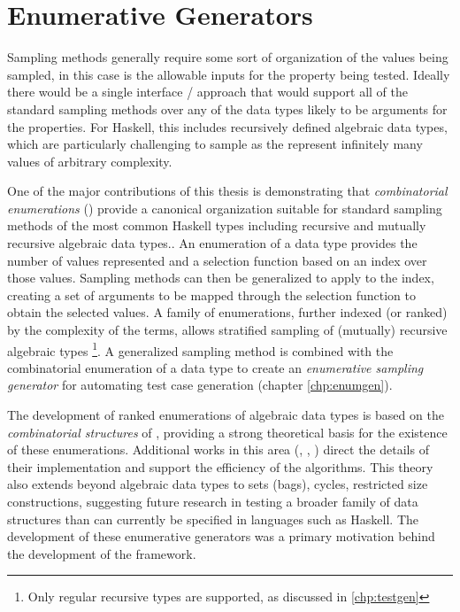 \section{Enumerative Generators}

Sampling methods generally require some sort of organization of the values being sampled,
in this case is the allowable inputs for the property being tested.
Ideally there would be a single interface / approach that would support 
all of the standard sampling methods over
any of the data types likely to be arguments for the properties.
For Haskell, this includes recursively defined algebraic data types,
which are particularly challenging to sample as the represent
infinitely many values of arbitrary complexity.

One of the major contributions of this thesis is
demonstrating that \emph{combinatorial enumerations} (\cite{FlSa95}) provide 
a canonical organization suitable for standard sampling methods
of the most common Haskell types including recursive and mutually recursive algebraic data types..
An enumeration  of a data type provides 
the number of values represented
and a selection function based on an index over those values.
Sampling methods can then be generalized to apply to the index,
creating a set of arguments to be mapped through the selection function to obtain the selected values.
A family of enumerations, further indexed (or ranked) by the complexity of the terms,
allows stratified sampling of (mutually) recursive algebraic types%
\footnote{Only regular recursive types are supported, as discussed in \ref{chp:testgen}}.
A generalized sampling method is combined with
the combinatorial enumeration of a data type to create an
\emph{enumerative sampling generator} for automating test case generation
(chapter \ref{chp:enumgen}).

The development of ranked enumerations of algebraic data types
is based on the \emph{combinatorial structures} of \cite{FlajoletSedgewick2009},
providing a strong theoretical basis for the existence of these enumerations.
Additional works in this area (\cite{FlSaZi91}, \cite{FlajoletZC94}, \cite{FlSa95})
direct the details of their implementation
and support the efficiency of the algorithms.
This theory also extends beyond algebraic data types to
sets (bags), cycles, restricted size constructions,
suggesting future research in testing a broader family of data structures
than can currently be specified in languages such as Haskell.
The development of these enumerative generators was a primary motivation
behind the development of the \GC framework.

